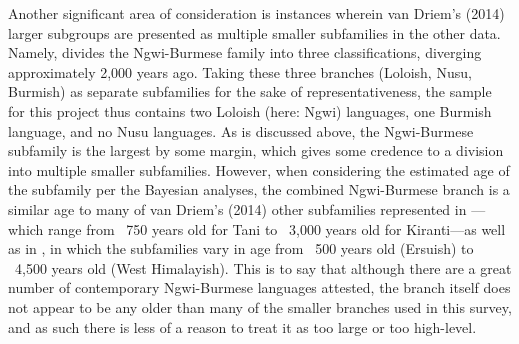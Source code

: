 Another significant area of consideration is instances wherein van Driem's (2014) larger subgroups are presented as multiple smaller subfamilies in the other data. Namely,  divides the Ngwi-Burmese family into three classifications, diverging approximately 2,000 years ago. Taking these three branches (Loloish, Nusu, Burmish) as separate subfamilies for the sake of representativeness, the sample for this project thus contains two Loloish (here: Ngwi) languages, one Burmish language, and no Nusu languages. As is discussed above, the Ngwi-Burmese subfamily is the largest by some margin, which gives some credence to a division into multiple smaller subfamilies. However, when considering the estimated age of the subfamily per the Bayesian analyses, the combined Ngwi-Burmese branch is a similar age to many of van Driem's (2014) other subfamilies represented in ---which range from ~750 years old for Tani to ~3,000 years old for Kiranti---as well as in , in which the subfamilies vary in age from ~500 years old (Ersuish) to ~4,500 years old (West Himalayish). This is to say that although there are a great number of contemporary Ngwi-Burmese languages attested, the branch itself does not appear to be any older than many of the smaller branches used in this survey, and as such there is less of a reason to treat it as too large or too high-level.



